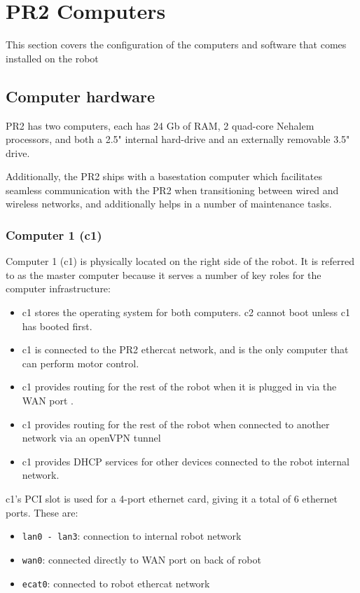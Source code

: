 \chapter{PR2 Computers}
This section covers the configuration of the computers and software that comes installed on the robot
\section{Computer hardware}
PR2 has two computers, each has 24 Gb of RAM, 2
quad-core Nehalem processors, and both a 2.5" internal hard-drive and an externally removable 3.5" drive.

Additionally, the PR2 ships with a basestation computer which
facilitates seamless communication with the PR2 when transitioning
between wired and wireless networks, and additionally helps in
a number of maintenance tasks.
\subsection{Computer 1 (c1)}
Computer 1 (c1) is physically located on the right side of the
robot. It is referred to as the master computer because it serves a
number of key roles for the computer infrastructure:
\begin{itemize}
\item c1 stores the operating system for both computers.  c2 cannot
  boot unless c1 has booted first.
\item c1 is connected to the PR2 ethercat network, and is the only
  computer that can perform motor control.
\item c1 provides routing for the rest of the robot when it is plugged
  in via the WAN port .
\item c1 provides routing for the rest of the robot when connected to
  another network via an openVPN tunnel
\item c1 provides DHCP services for other devices connected to the
  robot internal network.
\end{itemize}

c1's PCI slot is used for a 4-port ethernet card, giving it a
total of 6 ethernet ports. These are:
\begin{itemize}
\item \texttt{lan0 - lan3}: connection to internal robot network 
\item \texttt{wan0}: connected directly to WAN port on back of robot
\item \texttt{ecat0}: connected to robot ethercat network 
\end{itemize}

